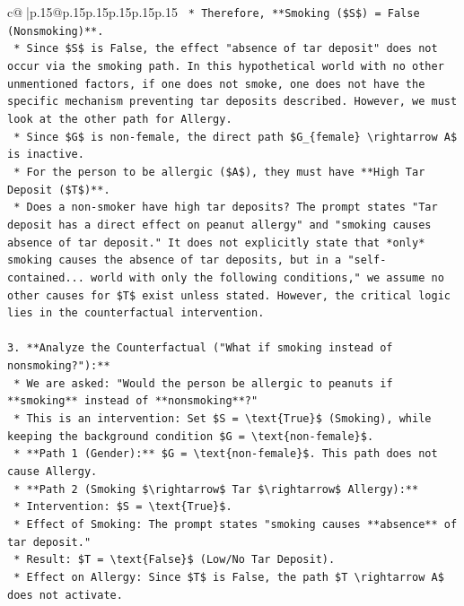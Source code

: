\documentclass{article}
\begin{document}
{\begin{supertabular}{c@{$\;$}|p{.15\linewidth}@{}p{.15\linewidth}p{.15\linewidth}p{.15\linewidth}p{.15\linewidth}p{.15\linewidth}}
{{{\texttt{    *   Therefore, **Smoking (\$S\$) = False (Nonsmoking)**.} \\
\texttt{    *   Since \$S\$ is False, the effect "absence of tar deposit" does not occur via the smoking path. In this hypothetical world with no other unmentioned factors, if one does not smoke, one does not have the specific mechanism preventing tar deposits described. However, we must look at the other path for Allergy.} \\
\texttt{    *   Since \$G\$ is non{-}female, the direct path \$G\_\{female\} \textbackslash{}rightarrow A\$ is inactive.} \\
\texttt{    *   For the person to be allergic (\$A\$), they must have **High Tar Deposit (\$T\$)**.} \\
\texttt{    *   Does a non{-}smoker have high tar deposits? The prompt states "Tar deposit has a direct effect on peanut allergy" and "smoking causes absence of tar deposit." It does not explicitly state that *only* smoking causes the absence of tar deposits, but in a "self{-}contained... world with only the following conditions," we assume no other causes for \$T\$ exist unless stated. However, the critical logic lies in the counterfactual intervention.} \\
\\ 
\texttt{3.  **Analyze the Counterfactual ("What if smoking instead of nonsmoking?"):**} \\
\texttt{    *   We are asked: "Would the person be allergic to peanuts if **smoking** instead of **nonsmoking**?"} \\
\texttt{    *   This is an intervention: Set \$S = \textbackslash{}text\{True\}\$ (Smoking), while keeping the background condition \$G = \textbackslash{}text\{non{-}female\}\$.} \\
\texttt{    *   **Path 1 (Gender):** \$G = \textbackslash{}text\{non{-}female\}\$. This path does not cause Allergy.} \\
\texttt{    *   **Path 2 (Smoking \$\textbackslash{}rightarrow\$ Tar \$\textbackslash{}rightarrow\$ Allergy):**} \\
\texttt{        *   Intervention: \$S = \textbackslash{}text\{True\}\$.} \\
\texttt{        *   Effect of Smoking: The prompt states "smoking causes **absence** of tar deposit."} \\
\texttt{        *   Result: \$T = \textbackslash{}text\{False\}\$ (Low/No Tar Deposit).} \\
\texttt{        *   Effect on Allergy: Since \$T\$ is False, the path \$T \textbackslash{}rightarrow A\$ does not activate.} \\
}}}
\end{supertabular}}
\end{document}
